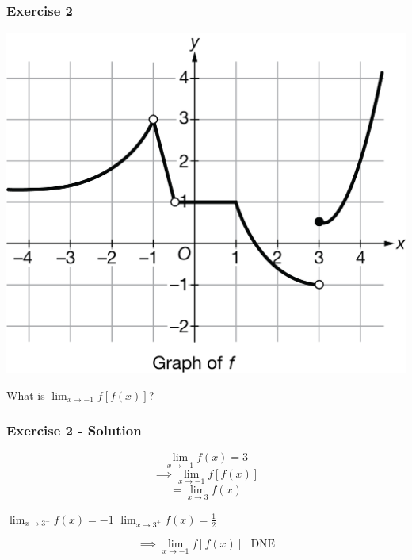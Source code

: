 \documentclass[12pt]{beamer}
\begin{document}
\begin{frame}
	\frametitle{Exercise 2}
	\initclock
	\begin{center}
		\includegraphics[scale=0.5]{graph0913.png}
	\end{center}
	\large
	\begin{center}
		What is $\displaystyle\lim_{x\to-1}f[f(x)]$?\\
	\end{center}
	\crono
\end{frame}
\begin{frame}
	\frametitle{Exercise 2 - Solution}

	\[\displaystyle\lim_{x\to-1}f(x) = 3\]
	\[\implies\displaystyle\lim_{x\to-1}f[f(x)]\]
	\[=\displaystyle\lim_{x\to3}f(x)\]
	\begin{table}[]
		$\displaystyle\lim_{x\to3^{-}}f(x)=-1$
		\hspace{0.25cm}
		$\displaystyle\lim_{x\to3^{+}}f(x)=\frac{1}{2}$
	\end{table}
	\[\implies\displaystyle\lim_{x\to-1}f[f(x)] \text{ }\boxed{\text{DNE}}\]
\end{frame}
\end{document}

